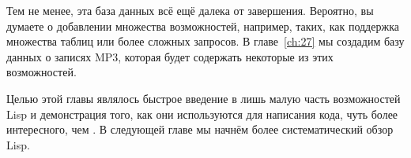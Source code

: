 Тем не менее, эта база данных всё ещё далека от завершения. Вероятно, вы думаете о
добавлении множества возможностей, например, таких, как поддержка множества таблиц или
более сложных запросов. В главе~\ref{ch:27} мы создадим базу данных о записях MP3, которая будет
содержать некоторые из этих возможностей.

Целью этой главы являлось быстрое введение в лишь малую часть возможностей Lisp и
демонстрация того, как они используются для написания кода, чуть более интересного, чем
. В следующей главе мы начнём более систематический обзор Lisp.

